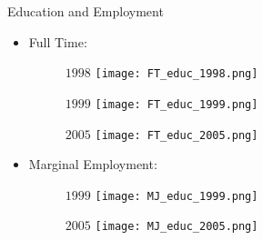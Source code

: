 \documentclass{beamer}
\begin{document}
\begin{frame}{Education and Employment}
\begin{itemize}
\item Full Time:
\begin{figure}
\begin{minipage}[b]{0.3\textwidth}{$1998$}
\centering
\texttt{[image: FT\_educ\_1998.png]}
\end{minipage}
\begin{minipage}[b]{0.3\textwidth}{$1999$}
\centering
\texttt{[image: FT\_educ\_1999.png]}
\end{minipage}
\begin{minipage}[b]{0.3\textwidth}{$2005$}
\centering
\texttt{[image: FT\_educ\_2005.png]}
\end{minipage}
\end{figure}
\item Marginal Employment:
\begin{figure}
\begin{minipage}[b]{0.3\textwidth}{$1999$}
\centering
\texttt{[image: MJ\_educ\_1999.png]}
\end{minipage}
\begin{minipage}[b]{0.3\textwidth}{$2005$}
\centering
\texttt{[image: MJ\_educ\_2005.png]}
\end{minipage}
\end{figure}
\end{itemize}
\end{frame}
\end{document}
